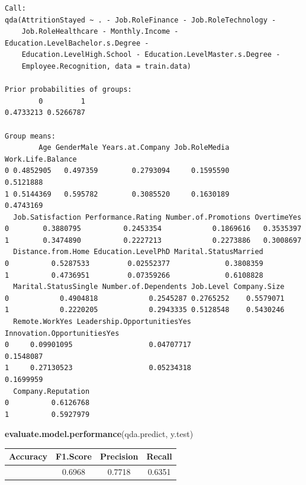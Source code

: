\documentclass[
  10pt,
  paper=a4,
  ,captions=tableheading
]{scrartcl}
\newenvironment{Shaded}{\begin{snugshade}}{\end{snugshade}}
\newcommand{\FunctionTok}[1]{\textcolor[rgb]{0.13,0.29,0.53}{\textbf{#1}}}
\newcommand{\NormalTok}[1]{#1}
\begin{document}
\begin{verbatim}
Call:
qda(AttritionStayed ~ . - Job.RoleFinance - Job.RoleTechnology - 
    Job.RoleHealthcare - Monthly.Income - Education.LevelBachelor.s.Degree - 
    Education.LevelHigh.School - Education.LevelMaster.s.Degree - 
    Employee.Recognition, data = train.data)

Prior probabilities of groups:
        0         1 
0.4733213 0.5266787 

Group means:
        Age GenderMale Years.at.Company Job.RoleMedia Work.Life.Balance
0 0.4852905   0.497359        0.2793094     0.1595590         0.5121888
1 0.5144369   0.595782        0.3085520     0.1630189         0.4743169
  Job.Satisfaction Performance.Rating Number.of.Promotions OvertimeYes
0        0.3880795          0.2453354            0.1869616   0.3535397
1        0.3474890          0.2227213            0.2273886   0.3008697
  Distance.from.Home Education.LevelPhD Marital.StatusMarried
0          0.5287533         0.02552377             0.3808359
1          0.4736951         0.07359266             0.6108828
  Marital.StatusSingle Number.of.Dependents Job.Level Company.Size
0            0.4904818            0.2545287 0.2765252    0.5579071
1            0.2220205            0.2943335 0.5128548    0.5430246
  Remote.WorkYes Leadership.OpportunitiesYes Innovation.OpportunitiesYes
0     0.09901095                  0.04707717                   0.1548087
1     0.27130523                  0.05234318                   0.1699959
  Company.Reputation
0          0.6126768
1          0.5927979
\end{verbatim}

\begin{Shaded}
\begin{Highlighting}[]
\FunctionTok{evaluate.model.performance}\NormalTok{(qda.predict, y.test)}
\end{Highlighting}
\end{Shaded}

\begin{longtable}[]{@{}cccc@{}}
\toprule\noalign{}
Accuracy & F1.Score & Precision & Recall \\
\midrule\noalign{}
\endhead
\bottomrule\noalign{}
\endlastfoot
0.713 & 0.6968 & 0.7718 & 0.6351 \\
\end{longtable}

\small
\end{document}
